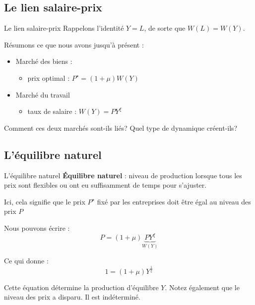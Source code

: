 \documentclass[
  ignorenonframetext,
  aspectratio=169,
]{beamer}
\providecommand{\tightlist}{%
  \setlength{\itemsep}{0pt}\setlength{\parskip}{0pt}}\usepackage{longtable,booktabs,array}
\begin{document}
\subsection{Le lien salaire-prix}\label{le-lien-salaire-prix}

\begin{frame}{Le lien salaire-prix}
Rappelons l'identité \(Y=L\), de sorte que \(W(L)=W(Y)\).

Résumons ce que nous avons jusqu'à présent :

\begin{itemize}
\tightlist
\item
  Marché des biens :

  \begin{itemize}
  \tightlist
  \item
    prix optimal : \(P^{\star} = (1+\mu) W(Y)\)
  \end{itemize}
\item
  Marché du travail

  \begin{itemize}
  \tightlist
  \item
    taux de salaire : \(W(Y) = P Y^{\xi}\)
  \end{itemize}
\end{itemize}

Comment ces deux marchés sont-ils liés? Quel type de dynamique
créent-ils?
\end{frame}

\subsection{L'équilibre naturel}\label{luxe9quilibre-naturel}

\begin{frame}{L'équilibre naturel}
\label{luxe9quilibre-naturel-1}
\textbf{Équilibre naturel} : niveau de production lorsque tous les prix
sont flexibles ou ont eu suffisamment de temps pour s'ajuster.

Ici, cela signifie que le prix \(P^{\star}\) fixé par les entreprises
doit être égal au niveau des prix \(P\)

Nous pouvons écrire : \[P = (1+\mu) \underbrace{P Y^{\xi}}_{W(Y)}\]

Ce qui donne : \[1=(1+\mu) Y^{\frac{1}{\xi}}\]

Cette équation détermine la production d'équilibre \(Y\). Notez
également que le niveau des prix a disparu. Il est indéterminé.
\end{frame}
\end{document}
